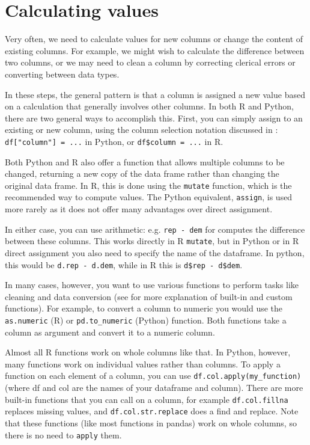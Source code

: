 \section{Calculating values}
\label{sec:calculate}

Very often, we need to calculate values for new columns or change the content of existing columns.
For example, we might wish to calculate the difference between two columns,
or we may need to clean a column by correcting clerical errors or converting between data types.

In these steps, the general pattern is that a column is assigned a new value based on
a calculation that generally involves other columns.
In both R and Python, there are two general ways to accomplish this.
First, you can simply assign to an existing or new column,
using the column selection notation discussed in :
\verb+df["column"] = ...+ in Python, or \verb+df$column = ...+ in R.

Both Python and R also offer a function that allows multiple columns to be changed,
returning a new copy of the data frame rather than changing the original data frame.
In R, this is done using the \verb+mutate+ function, which is the recommended way to compute values.
The Python equivalent, \verb+assign+, is used more rarely as it does not offer many advantages over direct assignment.

In either case, you can use arithmetic: e.g. \verb|rep - dem| for computes the difference between these columns.
This works directly in R \verb+mutate+,
but in Python or in R direct assignment you also need to specify the name of the dataframe.
In python, this would be \verb+d.rep - d.dem+, while in R this is \verb+d$rep - d$dem+. 

In many cases, however, you want to use various functions to perform tasks like cleaning and data conversion
(see  for more explanation of built-in and custom functions).
For example, to convert a column to numeric you would use the \verb+as.numeric+ (R) or \verb+pd.to_numeric+ (Python) function.
Both functions take a column as argument and convert it to a numeric column.

Almost all R functions work on whole columns like that.
In Python, however, many functions work on individual values rather than columns.
To apply a function on each element of a column, you can use \verb+df.col.apply(my_function)+
(where df and col are the names of your dataframe and column). 
There are more built-in functions that you can call on a column, for example \verb+df.col.fillna+ replaces
missing values, and \verb+df.col.str.replace+ does a find and replace.
Note that these functions (like most functions in pandas) work on whole columns,
so there is no need to \verb+apply+ them. 

